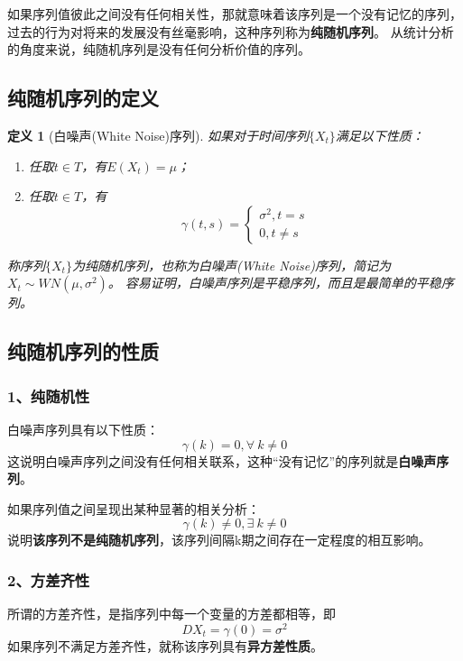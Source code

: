 \documentclass[12pt, a4paper, oneside]{ctexbook}
\newtheorem{definition}[theorem]{定义}
\begin{document}
如果序列值彼此之间没有任何相关性，那就意味着该序列是一个没有记忆的序列，
过去的行为对将来的发展没有丝毫影响，这种序列称为\textbf{纯随机序列}。
从统计分析的角度来说，纯随机序列是没有任何分析价值的序列。

\subsection{纯随机序列的定义}

\begin{definition}[白噪声(White Noise)序列]
    如果对于时间序列$\{X_t\}$满足以下性质：
    \begin{enumerate}[1、]
        \item 任取$t \in T$，有$E(X_t)=\mu$；
        \item 任取$t \in T$，有\begin{equation}
                  \gamma(t,s) = \begin{cases}
                      \sigma^2,t=s \\
                      0,t \neq s
                  \end{cases}
              \end{equation}
    \end{enumerate}
    称序列$\{X_t\}$为纯随机序列，也称为白噪声(White Noise)序列，简记为$X_t\sim WN(\mu,\sigma^2)$。
    容易证明，白噪声序列是平稳序列，而且是最简单的平稳序列。
\end{definition}

\subsection{纯随机序列的性质}
\subsubsection{1、纯随机性}
白噪声序列具有以下性质：
\begin{equation}\label{eq2.8}
    \gamma(k)=0,\forall ~k\neq 0
\end{equation}
这说明白噪声序列之间没有任何相关联系，这种“没有记忆”的序列就是\textbf{白噪声序列}。

如果序列值之间呈现出某种显著的相关分析：
\begin{equation}
    \gamma(k)\neq 0,\exists ~k\neq 0
\end{equation}
说明\textbf{该序列不是纯随机序列}，该序列间隔k期之间存在一定程度的相互影响。

\subsubsection{2、方差齐性}
所谓的方差齐性，是指序列中每一个变量的方差都相等，即
\begin{equation}
    DX_t = \gamma(0)=\sigma^2
\end{equation}
如果序列不满足方差齐性，就称该序列具有\textbf{异方差性质}。
\end{document}
